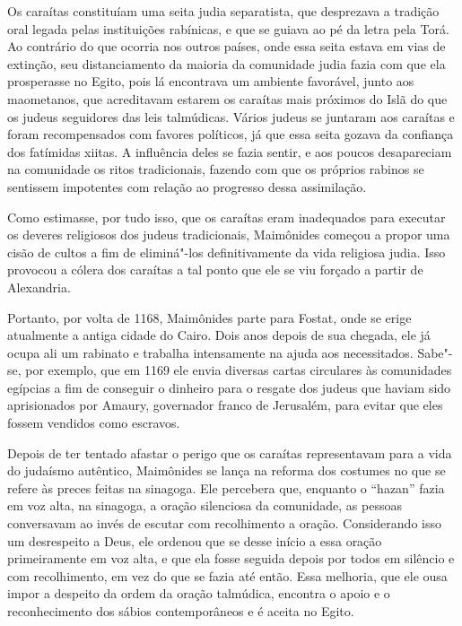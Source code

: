 Os caraítas constituíam uma seita judia separatista, que desprezava a
tradição oral legada pelas instituições rabínicas, e que se guiava ao pé
da letra pela Torá. Ao contrário do que ocorria nos outros
países, onde essa seita estava em vias de extinção, seu distanciamento
da maioria da comunidade judia fazia com que ela prosperasse no Egito, 
pois lá encontrava um ambiente
favorável, junto aos maometanos, que acreditavam estarem os caraítas
mais próximos do Islã do que os judeus seguidores das leis talmúdicas.
Vários judeus se juntaram aos caraítas e foram recompensados com favores
políticos, já que essa seita gozava da confiança dos fatímidas xiitas. A
influência deles se fazia sentir, e aos poucos desapareciam na
comunidade os ritos tradicionais, fazendo com que os próprios rabinos
se sentissem impotentes com relação ao progresso dessa assimilação.

Como estimasse, por tudo isso, que os caraítas eram inadequados para
executar os deveres religiosos dos judeus tradicionais, Maimônides
começou a propor uma cisão de cultos a fim de eliminá"-los
definitivamente da vida religiosa judia. Isso provocou a cólera dos
caraítas a tal ponto que ele se viu forçado a partir de Alexandria.

Portanto, por volta de 1168, Maimônides parte para Fostat, onde se erige
atualmente a antiga cidade do Cairo. Dois anos depois de sua chegada,
ele já ocupa ali um rabinato e trabalha intensamente na ajuda aos
necessitados. Sabe"-se, por exemplo, que em 1169 ele envia diversas
cartas circulares às comunidades egípcias a fim de conseguir o dinheiro
para o resgate dos judeus que haviam sido aprisionados por Amaury,
governador franco de Jerusalém, para evitar que eles fossem vendidos
como escravos.

Depois de ter tentado afastar o perigo que os caraítas representavam
para a vida do judaísmo autêntico, Maimônides se lança na reforma dos
costumes no que se refere às preces feitas na sinagoga. Ele percebera
que, enquanto o ``hazan'' fazia em voz alta, na sinagoga, a oração
silenciosa da comunidade, as pessoas conversavam ao invés de escutar com
recolhimento a oração. Considerando isso um desrespeito a Deus, ele
ordenou que se desse início a essa oração primeiramente em voz alta, e
que ela fosse seguida depois por todos em silêncio e com recolhimento,
em vez do que se fazia até então. Essa melhoria, que ele ousa impor a
despeito da ordem da oração talmúdica, encontra o apoio e o
reconhecimento dos sábios contemporâneos e é aceita no Egito.

